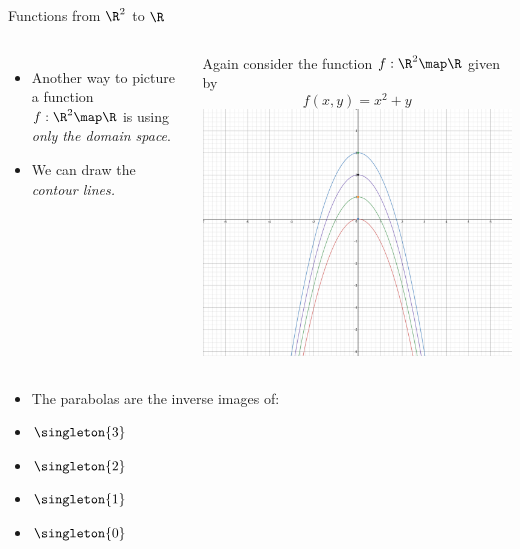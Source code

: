 \documentclass{beamer}
\begin{document}
\begin{frame}{Functions from $\R^2$ to $\R$}


\begin{columns}
\column[T]{5cm}
\begin{itemize}
\item Another way to picture a function $f:\R^2\map\R$ is using
\emph{only the domain space}.
\item  We can draw the \emph{contour lines.}
\end{itemize}

Again consider the function $f:\R^2\map\R$ given by
$$f(x,y) = x^2 + y$$
\column[T]{5cm}
\includegraphics[scale=0.1]{contour-parabolas}
\end{columns}


\begin{itemize}
\item The parabolas are the inverse images of:
\item $\singleton{3}$
\item $\singleton{2}$
\item $\singleton{1}$
\item $\singleton{0}$
\end{itemize}
\end{frame}
\end{document}
